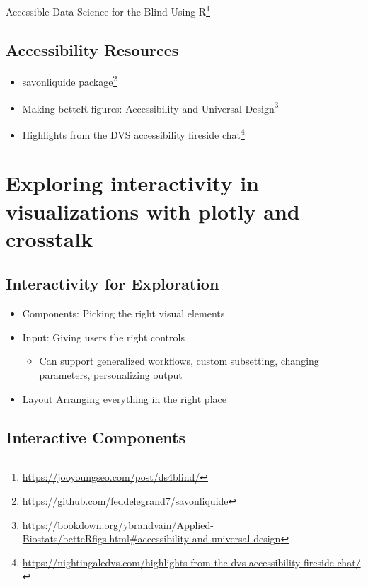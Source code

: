 \documentclass[
]{krantz}
\providecommand{\tightlist}{%
  \setlength{\itemsep}{0pt}\setlength{\parskip}{0pt}}
\renewcommand{\href}[2]{#2\footnote{\url{#1}}}
\begin{document}
\href{https://jooyoungseo.com/post/ds4blind/}{Accessible Data Science for the Blind Using R}

\hypertarget{accessibility-resources}{%
\section{Accessibility Resources}\label{accessibility-resources}}

\begin{itemize}
\item
  \href{https://github.com/feddelegrand7/savonliquide}{savonliquide package}
\item
  \href{https://bookdown.org/ybrandvain/Applied-Biostats/betteRfigs.html\#accessibility-and-universal-design}{Making betteR figures: Accessibility and Universal Design}
\item
  \href{https://nightingaledvs.com/highlights-from-the-dvs-accessibility-fireside-chat/}{Highlights from the DVS accessibility fireside chat}
\end{itemize}

\hypertarget{interactive-visualizations}{%
\chapter{Exploring interactivity in visualizations with plotly and crosstalk}\label{interactive-visualizations}}

\hypertarget{interactivity-for-exploration}{%
\section{Interactivity for Exploration}\label{interactivity-for-exploration}}

\begin{itemize}
\tightlist
\item
  Components: Picking the right visual elements
\item
  Input: Giving users the right controls

  \begin{itemize}
  \tightlist
  \item
    Can support generalized workflows, custom subsetting, changing parameters, personalizing output
  \end{itemize}
\item
  Layout Arranging everything in the right place
\end{itemize}

\hypertarget{interactive-components}{%
\section{Interactive Components}\label{interactive-components}}
\end{document}
